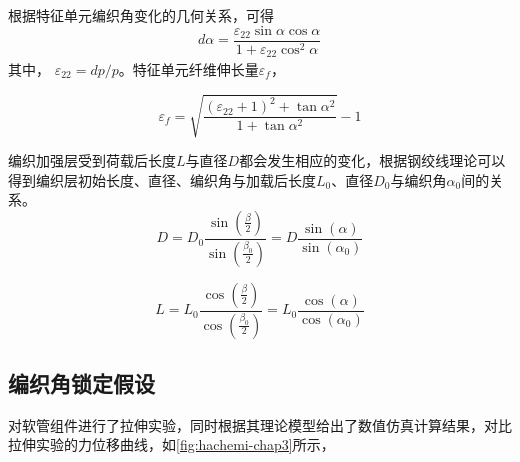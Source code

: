 根据特征单元编织角变化的几何关系，可得
\begin{equation}
d\alpha  = \frac{{{\varepsilon _{22}}\sin \alpha \cos \alpha }}{{1 + {\varepsilon _{22}}{{\cos }^2}\alpha }}_{}
\end{equation}
其中， $ \varepsilon_22= dp/p $。特征单元纤维伸长量$ \varepsilon_f $，


\begin{equation}
{\varepsilon _f} = \sqrt {\frac{{{{\left( {{\varepsilon _{22}} + 1} \right)}^2} + \tan {\alpha ^2}}}{{1 + \tan {\alpha ^2}}}}  - 1
\end{equation}

编织加强层受到荷载后长度$ L $与直径$ D $都会发生相应的变化，根据钢绞线理论可以得到编织层初始长度、直径、编织角与加载后长度$ {L_0} $、直径$ {D_0} $与编织角$ {\alpha _0} $间的关系。
\begin{equation}
D = {D_0}\frac{{\sin \left( {\frac{\beta }{2}} \right)}}{{\sin \left( {\frac{{{\beta _0}}}{2}} \right)}} = D\frac{{\sin \left( \alpha  \right)}}{{\sin \left( {{\alpha _0}} \right)}}
\end{equation}

\begin{equation}
L = {L_0}\frac{{\cos \left( {\frac{\beta }{2}} \right)}}{{\cos \left( {\frac{{{\beta _0}}}{2}} \right)}} = {L_0}\frac{{\cos \left( \alpha  \right)}}{{\cos \left( {{\alpha _0}} \right)}}
\end{equation}


\subsection{编织角锁定假设}

\hacite 对软管组件进行了拉伸实验，同时根据其理论模型给出了数值仿真计算结果，对比拉伸实验的力位移曲线，如\ref{fig:hachemi-chap3}所示，

